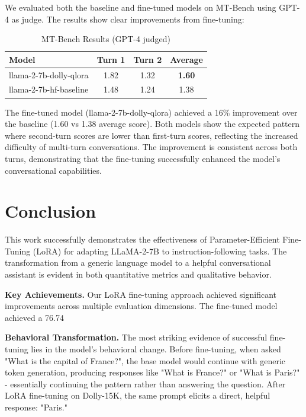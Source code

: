 \documentclass{assignment7_report}
\begin{document}
We evaluated both the baseline and fine-tuned models on MT-Bench using GPT-4 as judge. The results show clear improvements from fine-tuning:

\begin{table}[h!]
\centering
\caption{MT-Bench Results (GPT-4 judged)}
\label{tab:mt_bench_results}
\begin{tabular}{@{}lccc@{}}
\toprule
\textbf{Model} & \textbf{Turn 1} & \textbf{Turn 2} & \textbf{Average} \\ \midrule
llama-2-7b-dolly-qlora & 1.82 & 1.32 & \textbf{1.60} \\
llama-2-7b-hf-baseline & 1.48 & 1.24 & 1.38 \\ \bottomrule
\end{tabular}
\end{table}

The fine-tuned model (llama-2-7b-dolly-qlora) achieved a 16\% improvement over the baseline (1.60 vs 1.38 average score). Both models show the expected pattern where second-turn scores are lower than first-turn scores, reflecting the increased difficulty of multi-turn conversations. The improvement is consistent across both turns, demonstrating that the fine-tuning successfully enhanced the model's conversational capabilities.


\section{Conclusion}
\vspace*{-3mm}

This work successfully demonstrates the effectiveness of Parameter-Efficient Fine-Tuning (LoRA) for adapting LLaMA-2-7B to instruction-following tasks. The transformation from a generic language model to a helpful conversational assistant is evident in both quantitative metrics and qualitative behavior.

\textbf{Key Achievements.} Our LoRA fine-tuning approach achieved significant improvements across multiple evaluation dimensions. The fine-tuned model achieved a 76.74%

\textbf{Behavioral Transformation.} The most striking evidence of successful fine-tuning lies in the model's behavioral change. Before fine-tuning, when asked "What is the capital of France?", the base model would continue with generic token generation, producing responses like "What is France?" or "What is Paris?" - essentially continuing the pattern rather than answering the question. After LoRA fine-tuning on Dolly-15K, the same prompt elicits a direct, helpful response: "Paris."
\end{document}

